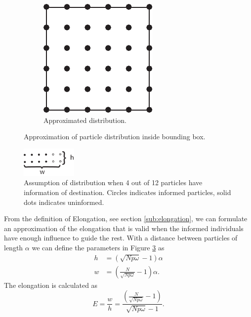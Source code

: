 \begin{figure}[H]
\begin{subfigure}[b]{\figwidth}
		\includegraphics[width=\textwidth]{img/Square.pdf}
		\caption{Approximated distribution.}
		\label{fig:distr_approx}
	\end{subfigure}
	\caption{Approximation of particle distribution inside bounding box.}
	\label{fig:distr}
\end{figure}

\begin{figure}[H]
	\centering
	\includegraphics[width=0.24\textwidth]{img/heightwidth.pdf}
	\caption{Assumption of distribution when 4 out of 12 particles have information of destination. Circles indicates informed particles, solid dots indicates uninformed.}
	\label{fig:distr_direction}
\end{figure}
From the definition of Elongation, see section \ref{sub:elongation}, we can formulate an approximation of the elongation that is valid when the informed individuals have enough influence to guide the rest. With a distance between particles of length $\alpha$ we can define the parameters in Figure \ref{fig:distr_direction} as
\begin{align}
	h &= (\sqrt{Np\omega}-1)\alpha \\
	w & = (\frac{N}{\sqrt{Np\omega}} -1) \alpha.
\end{align}
The elongation is calculated as 
\begin{equation}
	E = \frac{w}{h} = \frac{(\frac{N}{\sqrt{Np\omega}} -1)}{\sqrt{Np\omega}-1}.
\end{equation}
